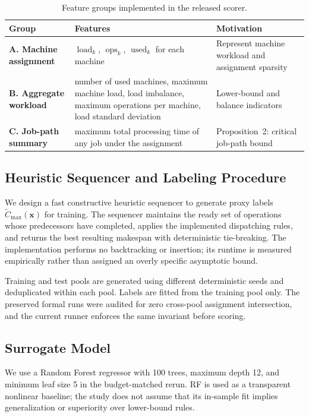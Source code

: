 \documentclass[12pt]{article}
\begin{document}
\begin{table}[htbp]\centering\caption{Feature groups implemented in the released scorer.}\label{tab:features}
\begin{tabular}{llp{6cm}}\toprule
Group & Features & Motivation \\ \midrule
\textbf{A. Machine assignment} & $\operatorname{load}_k$, $\operatorname{ops}_k$, $\operatorname{used}_k$ for each machine & Represent machine workload and assignment sparsity \\
\textbf{B. Aggregate workload} & number of used machines, maximum machine load, load imbalance, maximum operations per machine, load standard deviation & Lower-bound and balance indicators \\
\textbf{C. Job-path summary} & maximum total processing time of any job under the assignment & Proposition~2: critical job-path bound \\ \bottomrule
\end{tabular}
\end{table}

\subsection{Heuristic Sequencer and Labeling Procedure}
We design a fast constructive heuristic sequencer to generate proxy labels $\tilde{C}_{\max}(\mathbf{x})$ for training. The sequencer maintains the ready set of operations whose predecessors have completed, applies the implemented dispatching rules, and returns the best resulting makespan with deterministic tie-breaking. The implementation performs no backtracking or insertion; its runtime is measured empirically rather than assigned an overly specific asymptotic bound.

Training and test pools are generated using different deterministic seeds and deduplicated within each pool. Labels are fitted from the training pool only. The preserved formal runs were audited for zero cross-pool assignment intersection, and the current runner enforces the same invariant before scoring.

\subsection{Surrogate Model}
We use a Random Forest regressor \citep{Breiman2001} with 100 trees, maximum depth 12, and minimum leaf size 5 in the budget-matched rerun. RF is used as a transparent nonlinear baseline; the study does not assume that its in-sample fit implies generalization or superiority over lower-bound rules.
\end{document}
